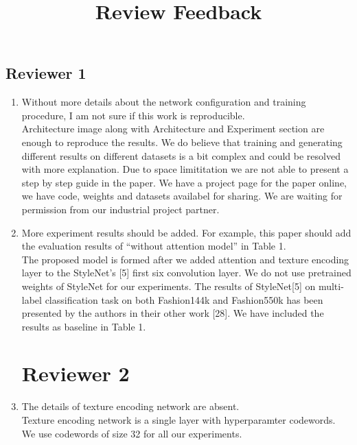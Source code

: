 \documentclass{article}
\begin{document}
\title{Review Feedback}
\maketitle
\begin{center}
\section*{Reviewer 1}
\end{center}

\begin{enumerate}
\item Without more details about the network configuration and training procedure, I am not sure if this work is reproducible. \\

Architecture image along with Architecture and Experiment section are enough to reproduce the results. We do believe that training and generating different results on different datasets is a bit complex and could be resolved with more explanation. Due to space limititation we are not able to present a step by step guide in the paper. We have a project page for the paper online, we have code, weights and datasets availabel for sharing. We are waiting for permission from our industrial project partner.

\item More experiment results should be added. For example, this paper should add the evaluation results of “without attention model” in Table 1. \\

The proposed model is formed after we added attention and texture encoding layer to the StyleNet's [5] first six convolution layer. We do not use pretrained weights of StyleNet for our experiments. The results of StyleNet[5] on multi-label classification task on both Fashion144k and Fashion550k has been presented by the authors in their other work [28]. We have included the results as baseline in Table 1. 

\begin{center}
\section*{Reviewer 2}
\end{center}


\item  The details of texture encoding network are absent. \\

Texture encoding network is a single layer with hyperparamter codewords. We use codewords of size 32 for all our experiments.

 

\end{enumerate}
\end{document}
